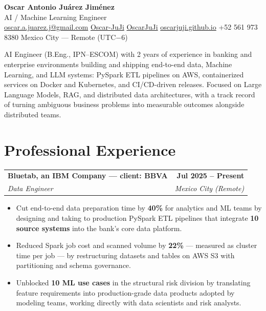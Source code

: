\documentclass[letterpaper,10pt]{article}
\makeatletter
\newif\ifhasfa
\newcommand{\iMail}{\faEnvelope}
\newcommand{\iGit}{\faGithub}
\newcommand{\iIn}{\faLinkedin}
\newcommand{\iWeb}{\faGlobe}
\newcommand{\iPhone}{\faPhone}
\newcommand{\iPin}{\faMapMarker}
\newcommand{\iMail}{}\newcommand{\iGit}{}\newcommand{\iIn}{}
\newcommand{\iWeb}{}\newcommand{\iPhone}{}\newcommand{\iPin}{}
\newcommand{\icon}[2]{\ifhasfa#1~\fi#2}
\newcommand{\role}[4]{%
  \vspace{2pt}%
  \begin{tabularx}{\textwidth}{@{}X r@{}}
    \textbf{#1} & \textbf{#2} \\
    \textit{#3} & \textit{#4} \\
  \end{tabularx}%
  \vspace{-2pt}%
}
\newenvironment{bullets}
  {\begin{itemize}[leftmargin=1.3em,itemsep=1pt,topsep=2pt,parsep=0pt,label=\textbullet]}
  {\end{itemize}}
\makeatother
\begin{document}
\begin{center}
  {\LARGE\bfseries Oscar Antonio Juárez Jiménez}\\[2pt]
  {\large AI / Machine Learning Engineer}\\[5pt]
  \small
  \icon{\iMail}{\href{mailto:oscar.a.juarez.j@gmail.com}{oscar.a.juarez.j@gmail.com}} \quad
  \icon{\iGit}{\href{https://github.com/Oscar-JuJi}{Oscar-JuJi}} \quad
  \icon{\iIn}{\href{https://www.linkedin.com/in/OscarJuJi}{OscarJuJi}} \quad
  \icon{\iWeb}{\href{https://oscarjuji.github.io}{oscarjuji.github.io}} \quad
  \icon{\iPhone}{+52 561 973 8380} \quad
  \icon{\iPin}{Mexico City --- Remote (UTC$-$6)}
\end{center}
\vspace{2pt}

AI Engineer (B.Eng., IPN--ESCOM) with 2 years of experience in banking and enterprise
environments building and shipping end-to-end data, Machine Learning, and LLM systems:
PySpark ETL pipelines on AWS, containerized services on Docker and Kubernetes, and
CI/CD-driven releases. Focused on Large Language Models, RAG, and distributed data
architectures, with a track record of turning ambiguous business problems into measurable
outcomes alongside distributed teams.

\section{Professional Experience}

\role{Bluetab, an IBM Company --- client: BBVA}{Jul 2025 -- Present}
     {Data Engineer}{Mexico City (Remote)}
\begin{bullets}
  \item Cut end-to-end data preparation time by \textbf{40\%} for analytics and ML teams
        by designing and taking to production PySpark ETL pipelines that integrate
        \textbf{10 source systems} into the bank's core data platform.
  \item Reduced Spark job cost and scanned volume by \textbf{22\%} --- measured as cluster
        time per job --- by restructuring datasets and tables on AWS S3 with partitioning
        and schema governance.
  \item Unblocked \textbf{10 ML use cases} in the structural risk division by translating
        feature requirements into production-grade data products adopted by modeling
        teams, working directly with data scientists and risk analysts.
\end{bullets}
\end{document}
